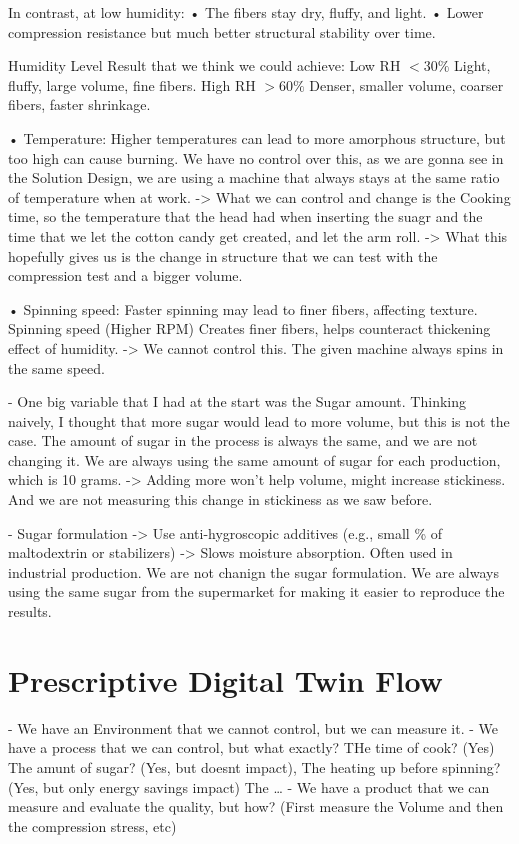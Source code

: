 In contrast, at low humidity:
	•	The fibers stay dry, fluffy, and light.
	•	Lower compression resistance but much better structural stability over time.

    Humidity Level
        Result that we think we could achieve:
        Low RH \(<30\%\)
        Light, fluffy, large volume, fine fibers.
        High RH \(>60\%\)
        Denser, smaller volume, coarser fibers, faster shrinkage.


    •	Temperature: Higher temperatures can lead to more amorphous structure, but too high can cause burning. We have no control over this, as we are gonna see in the Solution Design, we are using a machine that always stays at the same ratio of temperature when at work. 
    -> What we can control and change is the Cooking time, so the temperature that the head had when inserting the suagr and the time that we let the cotton candy get created, and let the arm roll. -> What this hopefully gives us is the change in structure that we can test with the compression test and a bigger volume.

    •	Spinning speed: Faster spinning may lead to finer fibers, affecting texture. Spinning speed (Higher RPM) Creates finer fibers, helps counteract thickening effect of humidity. -> We cannot control this. The given machine always spins in the same speed.

    -  One big variable that I had at the start was the Sugar amount. Thinking naively, I thought that more sugar would lead to more volume, but this is not the case. The amount of sugar in the process is always the same, and we are not changing it. We are always using the same amount of sugar for each production, which is 10 grams. -> Adding more won’t help volume, might increase stickiness. And we are not measuring this change in stickiness as we saw before.

    - Sugar formulation -> Use anti-hygroscopic additives (e.g., small \% of maltodextrin or stabilizers) -> Slows moisture absorption. Often used in industrial production. We are not chanign the sugar formulation. We are always using the same sugar from the supermarket for making it easier to reproduce the results.



\section{Prescriptive Digital Twin Flow}

- We have an Environment that we cannot control, but we can measure it.
- We have a process that we can control, but what exactly? THe time of cook? (Yes) The amunt of sugar? (Yes, but doesnt impact), The heating up before spinning? (Yes, but only energy savings impact) The \dots
- We have a product that we can measure and evaluate the quality, but how? (First measure the Volume and then the compression stress, etc) 


